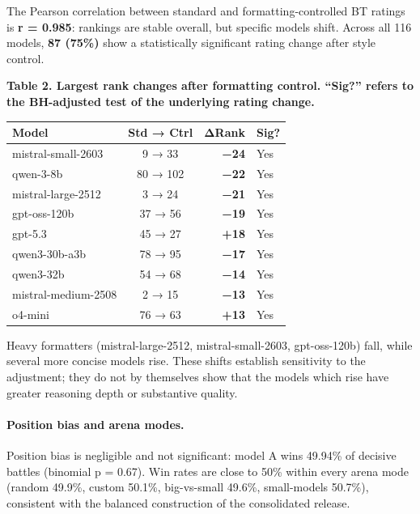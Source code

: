 \documentclass[
]{article}
\newcounter{none} %
\begin{document}
The Pearson correlation between standard and formatting-controlled BT ratings is
\textbf{r = 0.985}: rankings are stable overall, but specific models
shift. Across all 116 models, \textbf{87 (75\%)} show a statistically
significant rating change after style control.

\textbf{Table 2. Largest rank changes after formatting control. ``Sig?''
refers to the BH-adjusted test of the underlying rating change.}

{\def\LTcaptype{none} %
\begin{longtable}[]{@{}lcrl@{}}
\toprule\noalign{}
Model & Std → Ctrl & ΔRank & Sig? \\
\midrule\noalign{}
\endhead
\bottomrule\noalign{}
\endlastfoot
mistral-small-2603 & 9 → 33 & \textbf{−24} & Yes \\
qwen-3-8b & 80 → 102 & \textbf{−22} & Yes \\
mistral-large-2512 & 3 → 24 & \textbf{−21} & Yes \\
gpt-oss-120b & 37 → 56 & \textbf{−19} & Yes \\
gpt-5.3 & 45 → 27 & \textbf{+18} & Yes \\
qwen3-30b-a3b & 78 → 95 & \textbf{−17} & Yes \\
qwen3-32b & 54 → 68 & \textbf{−14} & Yes \\
mistral-medium-2508 & 2 → 15 & \textbf{−13} & Yes \\
o4-mini & 76 → 63 & \textbf{+13} & Yes \\
\end{longtable}
}

Heavy formatters (mistral-large-2512, mistral-small-2603, gpt-oss-120b)
fall, while several more concise models rise. These shifts establish
sensitivity to the adjustment; they do not by themselves show that the
models which rise have greater reasoning depth or substantive quality.

\paragraph{Position bias and arena modes.}\label{position-bias-and-arena-modes}

Position bias is negligible and not significant: model A wins 49.94\% of
decisive battles (binomial p = 0.67). Win rates are close to 50\% within
every arena mode (random 49.9\%, custom 50.1\%, big-vs-small 49.6\%,
small-models 50.7\%), consistent with the balanced construction of the
consolidated release.
\end{document}
